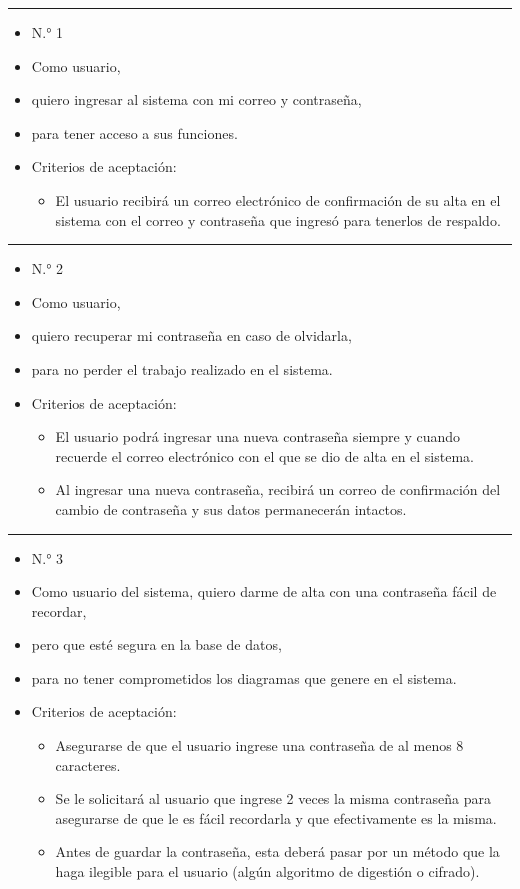 \noindent\rule{\textwidth}{1pt}
\begin{itemize}
	\item N.° 1
	\item Como usuario,
	\item quiero ingresar al sistema con mi correo y contraseña,
	\item para tener acceso a sus funciones.
	\item Criterios de aceptación:
	\begin{itemize}
		\item El usuario recibirá un correo electrónico de confirmación de su alta en el sistema con el correo y contraseña que ingresó para tenerlos de respaldo.
	\end{itemize}
\end{itemize}
\noindent\rule{\textwidth}{1pt}
\begin{itemize}
	\item N.° 2
	\item Como usuario,
	\item quiero recuperar mi contraseña en caso de olvidarla,
	\item para no perder el trabajo realizado en el sistema.
	\item Criterios de aceptación:
	\begin{itemize}
		\item El usuario podrá ingresar una nueva contraseña siempre y cuando recuerde el correo electrónico con el que se dio de alta en el sistema.
		\item Al ingresar una nueva contraseña, recibirá un correo de confirmación del cambio de contraseña y sus datos permanecerán intactos.
	\end{itemize}
\end{itemize}
\noindent\rule{\textwidth}{1pt}
\begin{itemize}
	\item N.° 3
	\item Como usuario del sistema, quiero darme de alta con una contraseña fácil de recordar,
	\item pero que esté segura en la base de datos,
	\item para no tener comprometidos los diagramas que genere en el sistema.

	\item Criterios de aceptación:
	\begin{itemize}
		\item Asegurarse de que el usuario ingrese una contraseña de al menos 8 caracteres.
		\item Se le solicitará al usuario que ingrese 2 veces la misma contraseña para asegurarse de que le es fácil recordarla y que efectivamente es la misma.
		\item Antes de guardar la contraseña, esta deberá pasar por un método que la haga ilegible para el usuario (algún algoritmo de digestión o cifrado).
	\end{itemize}
\end{itemize}
